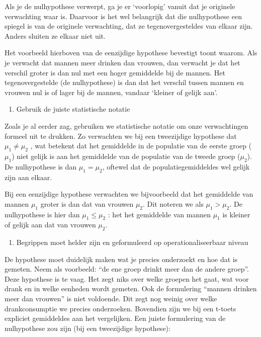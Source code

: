 \documentclass[
  letterpaper,
  DIV=11,
  numbers=noendperiod]{scrreprt}
\providecommand{\tightlist}{%
  \setlength{\itemsep}{0pt}\setlength{\parskip}{0pt}}
\begin{document}
Als je de nulhypothese verwerpt, ga je er `voorlopig' vanuit dat je
originele verwachting waar is. Daarvoor is het wel belangrijk dat die
nulhypothese een spiegel is van de originele verwachting, dat ze
tegenovergesteldes van elkaar zijn. Anders sluiten ze elkaar niet uit.

Het voorbeeld hierboven van de eenzijdige hypothese bevestigt toont
waarom. Als je verwacht dat mannen meer drinken dan vrouwen, dan
verwacht je dat het verschil groter is dan nul met een hoger gemiddelde
bij de mannen. Het tegenovergestelde (de nulhypothese) is dan dat het
verschil tussen mannen en vrouwen nul is of lager bij de mannen, vandaar
`kleiner of gelijk aan'.

\begin{enumerate}
\def\labelenumi{\arabic{enumi}.}
\setcounter{enumi}{2}
\tightlist
\item
  Gebruik de juiste statistische notatie
\end{enumerate}

Zoals je al eerder zag, gebruiken we statistische notatie om onze
verwachtingen formeel uit te drukken. Zo verwachten we bij een
tweezijdige hypothese dat \(\mu_1 \ne \mu_2\) , wat betekent dat het
gemiddelde in de populatie van de eerste groep (\(\mu_1\)) niet gelijk
is aan het gemiddelde van de populatie van de tweede groep (\(\mu_2\)).
De nulhypothese is dan \(\mu_1 =\mu_2\), oftewel dat de
populatiegemiddeldes wel gelijk zijn aan elkaar.

Bij een eenzijdige hypothese verwachten we bijvoorbeeld dat het
gemiddelde van mannen \(\mu_1\) groter is dan dat van vrouwen \(\mu_2\).
Dit noteren we als \(\mu_1 > \mu_2\). De nulhypothese is hier dan
\(\mu_1 \le \mu_2\) : het het gemiddelde van mannen \(\mu_1\) is kleiner
of gelijk aan dat van vrouwen \(\mu_2\).

\begin{enumerate}
\def\labelenumi{\arabic{enumi}.}
\setcounter{enumi}{3}
\tightlist
\item
  Begrippen moet helder zijn en geformuleerd op operationaliseerbaar
  niveau
\end{enumerate}

De hypothese moet duidelijk maken wat je precies onderzoekt en hoe dat
is gemeten. Neem als voorbeeld: ``de ene groep drinkt meer dan de andere
groep''. Deze hypothese is te vaag. Het zegt niks over welke groepen het
gaat, wat voor drank en in welke eenheden wordt gemeten. Ook de
formulering ``mannen drinken meer dan vrouwen'' is niet voldoende. Dit
zegt nog weinig over welke drankconsumptie we precies onderzoeken.
Bovendien zijn we bij een t-toets expliciet gemiddeldes aan het
vergelijken. Een juiste formulering van de nulhypothese zou zijn (bij
een tweezijdige hypothese):
\end{document}
